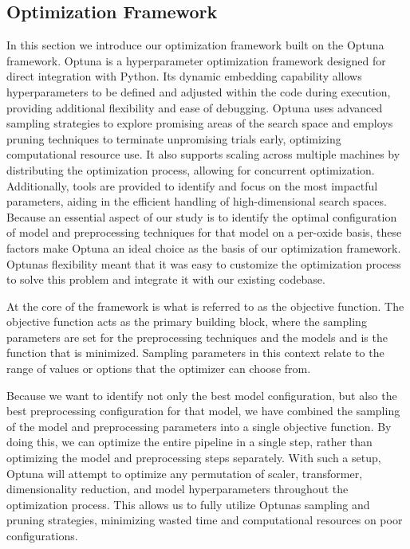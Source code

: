 \subsection{Optimization Framework}\label{sec:optimization-framework}




















In this section we introduce our optimization framework built on the Optuna framework.
Optuna is a hyperparameter optimization framework designed for direct integration with Python. Its dynamic embedding capability allows hyperparameters to be defined and adjusted within the code during execution, providing additional flexibility and ease of debugging. 
Optuna uses advanced sampling strategies to explore promising areas of the search space and employs pruning techniques to terminate unpromising trials early, optimizing computational resource use. 
It also supports scaling across multiple machines by distributing the optimization process, allowing for concurrent optimization. 
Additionally, tools are provided to identify and focus on the most impactful parameters, aiding in the efficient handling of high-dimensional search spaces. \cite{optuna_2019} 
Because an essential aspect of our study is to identify the optimal configuration of model and preprocessing techniques for that model on a per-oxide basis, these factors make Optuna an ideal choice as the basis of our optimization framework.
Optunas flexibility meant that it was easy to customize the optimization process to solve this problem and integrate it with our existing codebase.

At the core of the framework is what is referred to as the objective function.
The objective function acts as the primary building block, where the sampling parameters are set for the preprocessing techniques and the models and is the function that is minimized. %
Sampling parameters in this context relate to the range of values or options that the optimizer can choose from.

Because we want to identify not only the best model configuration, but also the best preprocessing configuration for that model, we have combined the sampling of the model and preprocessing parameters into a single objective function.
By doing this, we can optimize the entire pipeline in a single step, rather than optimizing the model and preprocessing steps separately.
With such a setup, Optuna will attempt to optimize any permutation of scaler, transformer, dimensionality reduction, and model hyperparameters throughout the optimization process.
This allows us to fully utilize Optunas sampling and pruning strategies, minimizing wasted time and computational resources on poor configurations.

